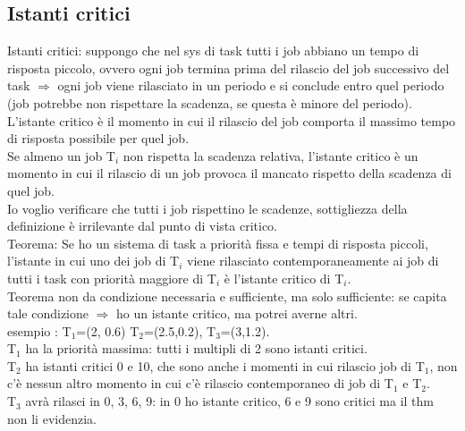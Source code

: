 \documentclass[12pt, oneside]{extbook}
\begin{document}
\subsection{Istanti critici}
Istanti critici: suppongo che nel sys di task tutti i job abbiano un tempo di risposta piccolo, ovvero ogni job termina prima del rilascio del job successivo del task $\Rightarrow$ ogni job viene rilasciato in un periodo e si conclude entro quel periodo (job potrebbe non rispettare la scadenza, se questa è minore del periodo).\\ L'istante critico è il momento in cui il rilascio del job comporta il massimo tempo di risposta possibile  per quel job.\\ Se almeno un job T$_{i}$ non rispetta la scadenza relativa, l'istante critico è un momento in cui il rilascio di un job provoca il mancato rispetto della scadenza di quel job.\\ Io voglio verificare che tutti i job rispettino le scadenze, sottigliezza della definizione è irrilevante dal punto di vista critico.\\ Teorema: Se ho un sistema di task a priorità fissa e tempi di risposta piccoli, l'istante in cui uno dei job di T$_{i}$  viene rilasciato contemporaneamente ai job di tutti i task con priorità maggiore di T$_{i}$ è l'istante critico di T$_{i}$.\\ Teorema non da condizione necessaria e sufficiente, ma solo sufficiente: se capita tale condizione $\Rightarrow$ ho un istante critico, ma potrei averne altri.\\ esempio : T$_{1}$=(2, 0.6) T$_{2}$=(2.5,0.2), T$_{3}$=(3,1.2).\\ T$_{1}$ ha la priorità massima: tutti i multipli di 2 sono istanti critici.\\ T$_{2}$ ha istanti critici 0 e 10, che sono anche i momenti in cui rilascio job di T$_{1}$, non c'è nessun altro momento in cui c'è rilascio contemporaneo di job di T$_{1}$ e T$_{2}$.\\ T$_{3}$ avrà rilasci in 0, 3, 6, 9: in 0 ho istante critico, 6 e 9 sono critici ma il thm non li evidenzia.\\
\end{document}
